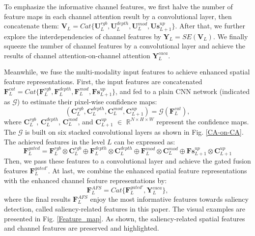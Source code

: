 \documentclass[runningheads]{llncs}
\begin{document}
To emphasize the informative channel features, we first halve the number of feature maps in each channel attention result by a convolutional layer, then concatenate them: $\mathbf{V}_{L} =Cat\{\mathbf{U}_{L}^{rgb}, \mathbf{U}_{L}^{depth},\mathbf{U}_{L}^{mod}, \mathbf{Us}_{L+1}^{up}\}$.
After that, we further explore the interdependencies of channel features by $\mathbf{Y}_{L} = SE(\mathbf{V}_{L})$.
We finally squeeze the number of channel features by a convolutional layer and achieve the results of channel attention-on-channel attention  $\mathbf{Y}_{L}^{caca}$.

Meanwhile, we fuse the multi-modality input features to achieve enhanced spatial feature representations.
First, the input features are concatenated $\mathbf{F}_{L}^{cat}=Cat\{\mathbf{F}_{L}^{rgb}, \mathbf{F}_{L}^{depth}, \mathbf{F}_{L}^{mod}, \mathbf{Fs}_{L+1}^{up}\}$, and fed to a plain CNN network (indicated as $\mathcal{G}$) to estimate their pixel-wise confidence maps:
\begin{equation}
\label{equ_8}
(\mathbf{C}_{L}^{rgb}, \mathbf{C}_{L}^{depth}, \mathbf{C}_{L}^{mod}, \mathbf{C}_{L+1}^{up}) = \mathcal{G}(\mathbf{F}_{L}^{cat}),
\end{equation}
where $\mathbf{C}_{L}^{rgb}$, $\mathbf{C}_{L}^{depth}$, $\mathbf{C}_{L}^{mod}$, and $\mathbf{C}_{L+1}^{up}$ $\in$ $\mathbb{R}^{N\times H\times W}$ represent the confidence maps. The $\mathcal{G}$ is built on six stacked convolutional layers as shown in Fig. \ref{CA-on-CA}. The achieved features in the level $L$ can be expressed as:
\begin{equation}
\label{equ_9}
\mathbf{F}_{L}^{gated}=\mathbf{F}_{L}^{rgb}\otimes \mathbf{C}_{L}^{rgb} \oplus \mathbf{F}_{L}^{depth} \otimes\mathbf{C}_{L}^{depth}\oplus\mathbf{F}_{L}^{mod} \otimes\mathbf{C}_{L}^{mod}\oplus \mathbf{Fs}_{L+1}^{up} \otimes\mathbf{C}_{L+1}^{up}
\end{equation}
Then, we pass these features to a convolutional layer and achieve the gated fusion features $\mathbf{F}_{L}^{gated'}$. At last, we combine the enhanced spatial feature representations with the enhanced channel feature representations by:
\begin{equation}
\label{equ_10}
\mathbf{F}_{L}^{AFS}=Cat\{\mathbf{F}_{L}^{gated'}, \mathbf{Y}_{L}^{caca}\},
\end{equation}
where the final results $\mathbf{F}_{L}^{AFS}$ enjoy the most informative features towards saliency detection, called saliency-related features in this paper. The visual examples are presented in Fig. \ref{Feature_map}. As shown, the saliency-related spatial features and channel features are preserved and highlighted.
\end{document}
